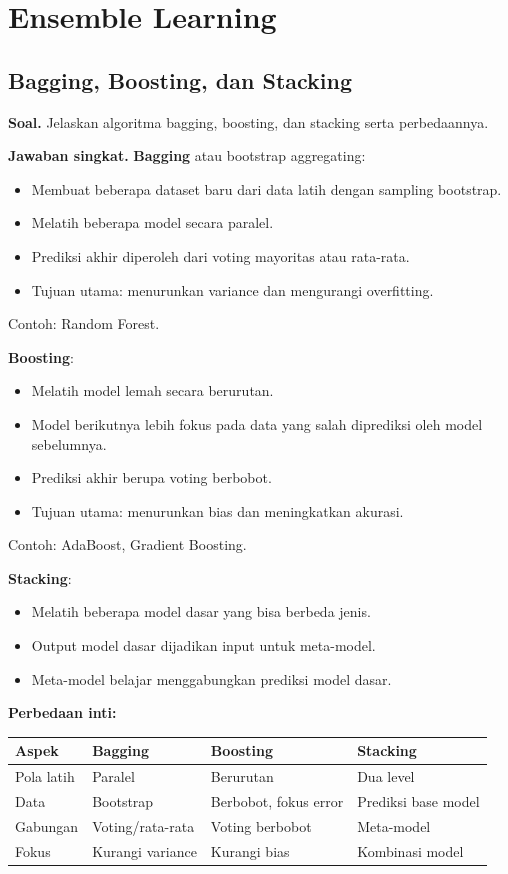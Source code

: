 \documentclass[a4paper,10pt,twocolumn]{article}
\newcommand{\soal}[1]{\textbf{Soal.} #1}
\newcommand{\jawab}{\textbf{Jawaban singkat.} }
\begin{document}
\section{Ensemble Learning}

\subsection{Bagging, Boosting, dan Stacking}

\soal{Jelaskan algoritma bagging, boosting, dan stacking serta perbedaannya.}

\jawab
\textbf{Bagging} atau bootstrap aggregating:
\begin{itemize}
    \item Membuat beberapa dataset baru dari data latih dengan sampling bootstrap.
    \item Melatih beberapa model secara paralel.
    \item Prediksi akhir diperoleh dari voting mayoritas atau rata-rata.
    \item Tujuan utama: menurunkan variance dan mengurangi overfitting.
\end{itemize}
Contoh: Random Forest.

\textbf{Boosting}:
\begin{itemize}
    \item Melatih model lemah secara berurutan.
    \item Model berikutnya lebih fokus pada data yang salah diprediksi oleh model sebelumnya.
    \item Prediksi akhir berupa voting berbobot.
    \item Tujuan utama: menurunkan bias dan meningkatkan akurasi.
\end{itemize}
Contoh: AdaBoost, Gradient Boosting.

\textbf{Stacking}:
\begin{itemize}
    \item Melatih beberapa model dasar yang bisa berbeda jenis.
    \item Output model dasar dijadikan input untuk meta-model.
    \item Meta-model belajar menggabungkan prediksi model dasar.
\end{itemize}

\textbf{Perbedaan inti:}
\begin{center}
\tiny
\begin{tabular}{p{1.5cm}|p{1.55cm}|p{1.55cm}|p{1.55cm}}
\toprule
Aspek & Bagging & Boosting & Stacking \\
\midrule
Pola latih & Paralel & Berurutan & Dua level \\
Data & Bootstrap & Berbobot, fokus error & Prediksi base model \\
Gabungan & Voting/rata-rata & Voting berbobot & Meta-model \\
Fokus & Kurangi variance & Kurangi bias & Kombinasi model \\
\bottomrule
\end{tabular}
\end{center}
\end{document}
